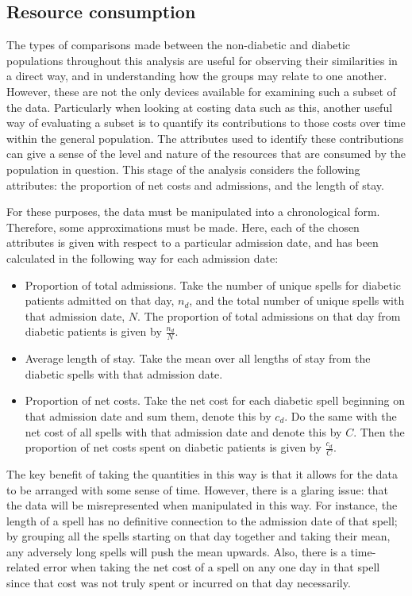 \subsection{Resource consumption}\label{subsec:diab_resources}

The types of comparisons made between the non-diabetic and diabetic populations
throughout this analysis are useful for observing their similarities in a direct
way, and in understanding how the groups may relate to one another. However,
these are not the only devices available for examining such a subset of the
data. Particularly when looking at costing data such as this, another useful way
of evaluating a subset is to quantify its contributions to those costs over time
within the general population. The attributes used to identify these
contributions can give a sense of the level and nature of the resources that are
consumed by the population in question. This stage of the analysis considers the
following attributes: the proportion of net costs and admissions, and the length
of stay. 

For these purposes, the data must be manipulated into a chronological form.
Therefore, some approximations must be made. Here, each of the chosen attributes
is given with respect to a particular admission date, and has been calculated in
the following way for each admission date:
\begin{itemize}
    \item Proportion of total admissions. Take the number of unique
        spells for diabetic patients admitted on that day, \(n_d\), and the
        total number of unique spells with that admission date, \(N\). The
        proportion of total admissions on that day from diabetic patients is
        given by \(\frac{n_d}{N}\).
    \item Average length of stay. Take the mean over all lengths of
        stay from the diabetic spells with that admission date.
    \item Proportion of net costs. Take the net cost for each diabetic
        spell beginning on that admission date and sum them, denote this by
        \(c_d\). Do the same with the net cost of all spells with that admission
        date and denote this by \(C\). Then the proportion of net costs spent on
        diabetic patients is given by \(\frac{c_d}{C}\).
\end{itemize}

The key benefit of taking the quantities in this way is that it allows for the
data to be arranged with some sense of time. However, there is a glaring issue:
that the data will be misrepresented when manipulated in this way. For instance,
the length of a spell has no definitive connection to the admission date of that
spell; by grouping all the spells starting on that day together and taking their
mean, any adversely long spells will push the mean upwards. Also, there is a
time-related error when taking the net cost of a spell on any one day in that
spell since that cost was not truly spent or incurred on that day necessarily.

